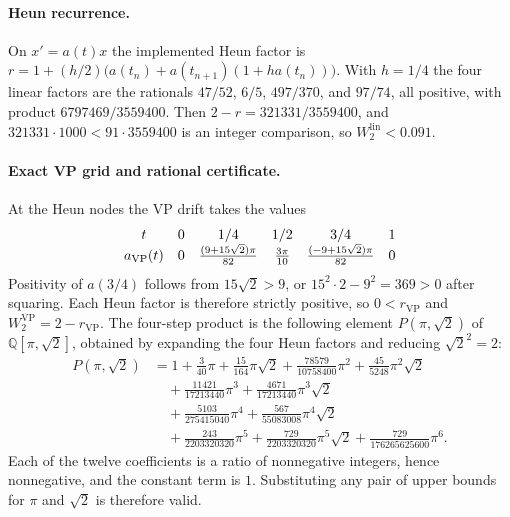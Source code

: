 \documentclass[11pt,a4paper]{article}
\theoremstyle{remark}
\newcommand{\wtwo}{W_2}
\begin{document}
\paragraph{Heun recurrence.}
On $x'=a(t)x$ the implemented Heun factor is
$r=1+(h/2)\bigl(a(t_n)+a(t_{n+1})(1+h a(t_n))\bigr)$. With $h=1/4$ the four
linear factors are the rationals $47/52$, $6/5$, $497/370$, and $97/74$, all
positive, with product $6797469/3559400$. Then $2-r=321331/3559400$, and
$321331\cdot 1000<91\cdot 3559400$ is an integer comparison, so
$\wtwo^{\mathrm{lin}}<0.091$.

\paragraph{Exact VP grid and rational certificate.}
At the Heun nodes the VP drift takes the values
\begin{equation}
  \begin{array}{c@{\quad}ccccc}
    t & 0 & 1/4 & 1/2 & 3/4 & 1 \\
    a_{\mathrm{VP}}(t) &
      0 &
      \tfrac{(9+15\sqrt{2})\pi}{82} &
      \tfrac{3\pi}{10} &
      \tfrac{(-9+15\sqrt{2})\pi}{82} &
      0
  \end{array}
\end{equation}
Positivity of $a(3/4)$ follows from $15\sqrt{2}>9$, or $15^2\cdot 2-9^2=369>0$
after squaring. Each Heun factor is therefore strictly positive, so
$0<r_{\mathrm{VP}}$ and $\wtwo^{\mathrm{VP}}=2-r_{\mathrm{VP}}$.
The four-step product is the following element $P(\pi,\sqrt{2})$ of
$\mathbb{Q}[\pi,\sqrt{2}]$, obtained by expanding the four Heun factors
and reducing $\sqrt{2}^2=2$:
\begin{equation}
\begin{aligned}
P(\pi,\sqrt{2})
&= 1+\frac{3}{40}\pi+\frac{15}{164}\pi\sqrt{2}
+\frac{78579}{10758400}\pi^2+\frac{45}{5248}\pi^2\sqrt{2}\\
&\quad+\frac{11421}{17213440}\pi^3
+\frac{4671}{17213440}\pi^3\sqrt{2}\\
&\quad+\frac{5103}{275415040}\pi^4
+\frac{567}{55083008}\pi^4\sqrt{2}\\
&\quad+\frac{243}{2203320320}\pi^5
+\frac{729}{2203320320}\pi^5\sqrt{2}
+\frac{729}{176265625600}\pi^6.
\end{aligned}
\end{equation}
Each of the twelve coefficients is a ratio of nonnegative integers, hence
nonnegative, and the constant term is $1$. Substituting any pair of
upper bounds for $\pi$ and $\sqrt{2}$ is therefore valid.
\end{document}
